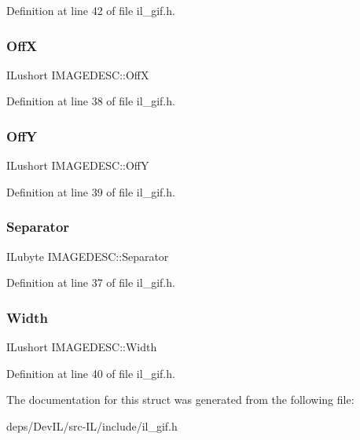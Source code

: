 Definition at line 42 of file il\+\_\+gif.\+h.

\mbox{\label{structIMAGEDESC_a02d3b4b1eb7e9a46d66af9af30a878a9}} 
\subsubsection{\texorpdfstring{OffX}{OffX}}
{\footnotesize\ttfamily I\+Lushort I\+M\+A\+G\+E\+D\+E\+S\+C\+::\+OffX}



Definition at line 38 of file il\+\_\+gif.\+h.

\mbox{\label{structIMAGEDESC_ac843c59bab872882dd6dbd38c4c3ccf5}} 
\subsubsection{\texorpdfstring{OffY}{OffY}}
{\footnotesize\ttfamily I\+Lushort I\+M\+A\+G\+E\+D\+E\+S\+C\+::\+OffY}



Definition at line 39 of file il\+\_\+gif.\+h.

\mbox{\label{structIMAGEDESC_ab634efbef6f0b82d403cb17368959362}} 
\subsubsection{\texorpdfstring{Separator}{Separator}}
{\footnotesize\ttfamily I\+Lubyte I\+M\+A\+G\+E\+D\+E\+S\+C\+::\+Separator}



Definition at line 37 of file il\+\_\+gif.\+h.

\mbox{\label{structIMAGEDESC_a9b7a022a37e7e33ce3517f0a13b3c97e}} 
\subsubsection{\texorpdfstring{Width}{Width}}
{\footnotesize\ttfamily I\+Lushort I\+M\+A\+G\+E\+D\+E\+S\+C\+::\+Width}



Definition at line 40 of file il\+\_\+gif.\+h.



The documentation for this struct was generated from the following file\+:\begin{DoxyCompactItemize}
\item 
deps/\+Dev\+I\+L/src-\/\+I\+L/include/il\+\_\+gif.\+h\end{DoxyCompactItemize}
